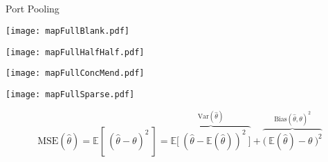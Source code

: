 \documentclass[ xcolor = pdftex, dvipsnames, table ]{beamer}
\begin{document}
\subsection{}
\begin{frame}{Port Pooling}%
\hspace{0.5cm}
\begin{minipage}[h!]{0.2\textwidth}
        \hspace*{-0.5cm}
        \texttt{[image: mapFullBlank.pdf]}
\end{minipage}
\begin{minipage}[h!]{0.2\textwidth}
        \hspace*{-0.25cm}
        \texttt{[image: mapFullHalfHalf.pdf]}
\end{minipage}
\begin{minipage}[h!]{0.2\textwidth}
        \hspace*{0.25cm}
        \texttt{[image: mapFullConcMend.pdf]}
\end{minipage}
\begin{minipage}[h!]{0.2\textwidth}
        \hspace*{0.5cm}                %
        \texttt{[image: mapFullSparse.pdf]}
\end{minipage}
\vspace{-0.5cm}
\begin{equation*}
\text{MSE}(\hat\theta) = \mathbb{E}\left[~(\hat\theta - \theta)^2~\right] = \overbrace{\mathbb{E}\Big[~\left(\hat\theta-\mathbb{E}(\hat\theta)\right)^2~\Big]}^{\text{Var}(\hat \theta)} + \overbrace{\Big(~\mathbb{E}(\hat\theta)-\theta~\Big)^2}^{\text{Bias}(\hat \theta, \theta)^2}
\end{equation*}
\end{frame}


%
%
\end{document}
